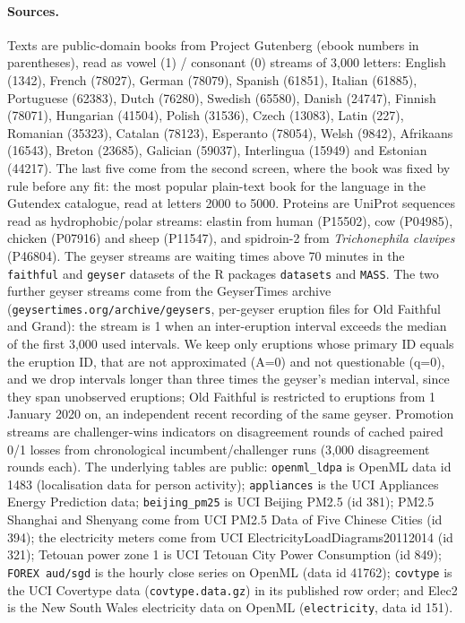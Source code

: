 \documentclass{article}
\theoremstyle{plain}
\theoremstyle{definition}
\theoremstyle{remark}
\begin{document}
\paragraph{Sources.} Texts are public-domain books from Project Gutenberg (ebook numbers in parentheses), read as vowel (1) / consonant (0) streams of 3{,}000 letters: English (1342), French (78027), German (78079), Spanish (61851), Italian (61885), Portuguese (62383), Dutch (76280), Swedish (65580), Danish (24747), Finnish (78071), Hungarian (41504), Polish (31536), Czech (13083), Latin (227), Romanian (35323), Catalan (78123), Esperanto (78054), Welsh (9842), Afrikaans (16543), Breton (23685), Galician (59037), Interlingua (15949) and Estonian (44217). The last five come from the second screen, where the book was fixed by rule before any fit: the most popular plain-text book for the language in the Gutendex catalogue, read at letters 2000 to 5000. Proteins are UniProt sequences read as hydrophobic/polar streams: elastin from human (P15502), cow (P04985), chicken (P07916) and sheep (P11547), and spidroin-2 from \emph{Trichonephila clavipes} (P46804). The geyser streams are waiting times above 70 minutes in the \texttt{faithful} \citep{azzalini1990faithful} and \texttt{geyser} datasets of the R packages \texttt{datasets} and \texttt{MASS}. The two further geyser streams come from the GeyserTimes archive (\texttt{geysertimes.org/archive/geysers}, per-geyser eruption files for Old Faithful and Grand): the stream is 1 when an inter-eruption interval exceeds the median of the first 3{,}000 used intervals. We keep only eruptions whose primary ID equals the eruption ID, that are not approximated (A=0) and not questionable (q=0), and we drop intervals longer than three times the geyser's median interval, since they span unobserved eruptions; Old Faithful is restricted to eruptions from 1 January 2020 on, an independent recent recording of the same geyser. Promotion streams are challenger-wins indicators on disagreement rounds of cached paired 0/1 losses from chronological incumbent/challenger runs (3{,}000 disagreement rounds each). The underlying tables are public: \texttt{openml\_ldpa} is OpenML data id 1483 (localisation data for person activity); \texttt{appliances} is the UCI Appliances Energy Prediction data; \texttt{beijing\_pm25} is UCI Beijing PM2.5 (id 381); PM2.5 Shanghai and Shenyang come from UCI PM2.5 Data of Five Chinese Cities (id 394); the electricity meters come from UCI ElectricityLoadDiagrams20112014 (id 321); Tetouan power zone 1 is UCI Tetouan City Power Consumption (id 849); \texttt{FOREX aud/sgd} is the hourly close series on OpenML (data id 41762); \texttt{covtype} is the UCI Covertype data (\texttt{covtype.data.gz}) in its published row order; and Elec2 is the New South Wales electricity data on OpenML (\texttt{electricity}, data id 151).
\end{document}
